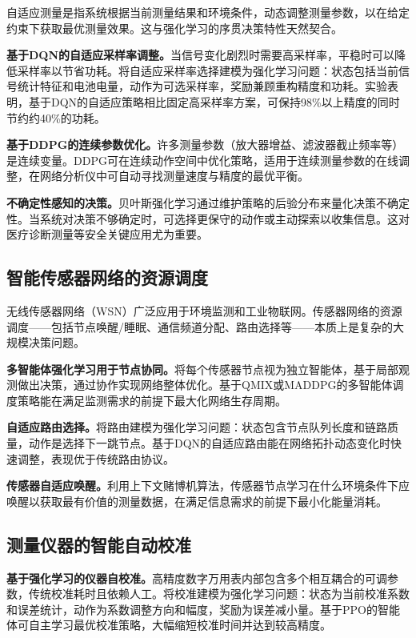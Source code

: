 \documentclass[12pt,a4paper]{article}
\numberwithin{figure}{section}
\numberwithin{table}{section}
\numberwithin{equation}{section}
\begin{document}
自适应测量是指系统根据当前测量结果和环境条件，动态调整测量参数，以在给定约束下获取最优测量效果。这与强化学习的序贯决策特性天然契合。

\textbf{基于DQN的自适应采样率调整。}当信号变化剧烈时需要高采样率，平稳时可以降低采样率以节省功耗。将自适应采样率选择建模为强化学习问题：状态包括当前信号统计特征和电池电量，动作为可选采样率，奖励兼顾重构精度和功耗。实验表明，基于DQN的自适应策略相比固定高采样率方案，可保持98\%以上精度的同时节约约40\%的功耗。

\textbf{基于DDPG的连续参数优化。}许多测量参数（放大器增益、滤波器截止频率等）是连续变量。DDPG可在连续动作空间中优化策略，适用于连续测量参数的在线调整，在网络分析仪中可自动寻找测量速度与精度的最优平衡。

\textbf{不确定性感知的决策。}贝叶斯强化学习通过维护策略的后验分布来量化决策不确定性。当系统对决策不够确定时，可选择更保守的动作或主动探索以收集信息。这对医疗诊断测量等安全关键应用尤为重要。

\subsection{智能传感器网络的资源调度}

无线传感器网络（WSN）广泛应用于环境监测和工业物联网。传感器网络的资源调度——包括节点唤醒/睡眠、通信频道分配、路由选择等——本质上是复杂的大规模决策问题。

\textbf{多智能体强化学习用于节点协同。}将每个传感器节点视为独立智能体，基于局部观测做出决策，通过协作实现网络整体优化。基于QMIX或MADDPG的多智能体调度策略能在满足监测需求的前提下最大化网络生存周期。

\textbf{自适应路由选择。}将路由建模为强化学习问题：状态包含节点队列长度和链路质量，动作是选择下一跳节点。基于DQN的自适应路由能在网络拓扑动态变化时快速调整，表现优于传统路由协议。

\textbf{传感器自适应唤醒。}利用上下文赌博机算法，传感器节点学习在什么环境条件下应唤醒以获取最有价值的测量数据，在满足信息需求的前提下最小化能量消耗。

\subsection{测量仪器的智能自动校准}

\textbf{基于强化学习的仪器自校准。}高精度数字万用表内部包含多个相互耦合的可调参数，传统校准耗时且依赖人工。将校准建模为强化学习问题：状态为当前校准系数和误差统计，动作为系数调整方向和幅度，奖励为误差减小量。基于PPO的智能体可自主学习最优校准策略，大幅缩短校准时间并达到较高精度。
\end{document}
